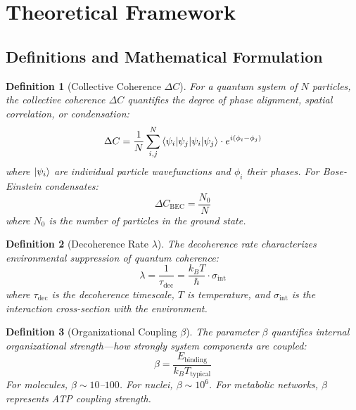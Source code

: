 \documentclass[12pt,a4paper]{article}
\newtheorem{definition}{Definition}
\begin{document}
\section{Theoretical Framework}
\label{sec:theory}

\subsection{Definitions and Mathematical Formulation}

\begin{definition}[Collective Coherence $\Delta C$]
For a quantum system of $N$ particles, the collective coherence $\Delta C$ quantifies the degree of phase alignment, spatial correlation, or condensation:
\begin{equation}
\Delta C = \frac{1}{N} \sum_{i,j}^{N} \braket{\psi_i | \psi_j} \cdot e^{i(\phi_i - \phi_j)}
\label{eq:collective_coherence}
\end{equation}
where $\ket{\psi_i}$ are individual particle wavefunctions and $\phi_i$ their phases. For Bose-Einstein condensates:
\begin{equation}
\Delta C_{\text{BEC}} = \frac{N_0}{N}
\label{eq:bec_coherence}
\end{equation}
where $N_0$ is the number of particles in the ground state.
\end{definition}

\begin{definition}[Decoherence Rate $\lambda$]
The decoherence rate characterizes environmental suppression of quantum coherence:
\begin{equation}
\lambda = \frac{1}{\tau_{\text{dec}}} = \frac{k_B T}{\hbar} \cdot \sigma_{\text{int}}
\label{eq:decoherence_rate}
\end{equation}
where $\tau_{\text{dec}}$ is the decoherence timescale, $T$ is temperature, and $\sigma_{\text{int}}$ is the interaction cross-section with the environment.
\end{definition}

\begin{definition}[Organizational Coupling $\beta$]
The parameter $\beta$ quantifies internal organizational strength---how strongly system components are coupled:
\begin{equation}
\beta = \frac{E_{\text{binding}}}{k_B T_{\text{typical}}}
\label{eq:beta_coupling}
\end{equation}
For molecules, $\beta \sim 10$--$100$. For nuclei, $\beta \sim 10^6$. For metabolic networks, $\beta$ represents ATP coupling strength.
\end{definition}
\end{document}
